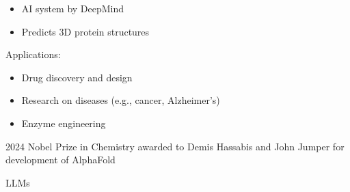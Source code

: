 \begin{frame}

    \begin{itemize}
        \item AI system by DeepMind 
            \vspace{0.5em}
        \item Predicts 3D protein structures
            \vspace{0.5em}
    \end{itemize}


            \vspace{0.5em}
    Applications:

    \begin{itemize}
        \item Drug discovery and design
            \vspace{0.5em}
        \item Research on diseases (e.g., cancer, Alzheimer's)
            \vspace{0.5em}
        \item Enzyme engineering 
    \end{itemize}

            \vspace{0.5em}
            \vspace{0.5em}
    2024 Nobel Prize in Chemistry awarded to Demis Hassabis and John
    Jumper for development of AlphaFold

\end{frame}



\begin{frame}{LLMs}
    
    \begin{figure}
       \centering
    \end{figure}

\end{frame}


